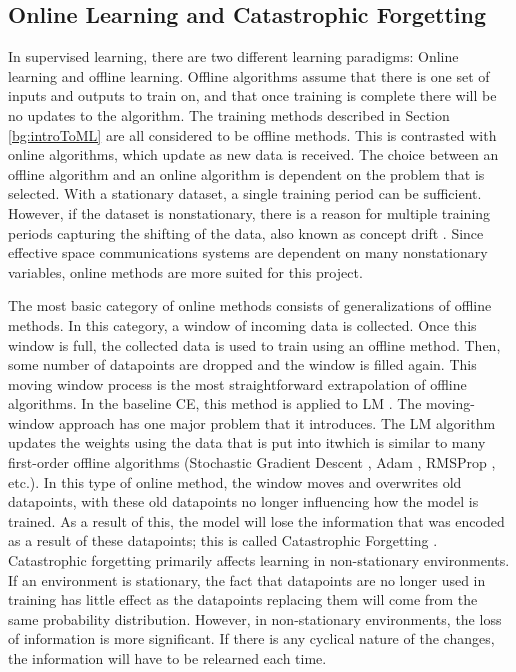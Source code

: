 	\subsection{Online Learning and Catastrophic Forgetting}\label{bg:onlineLearning}
	\par In supervised learning, there are two different learning paradigms: Online learning and offline learning. Offline algorithms assume that there is one set of inputs and outputs to train on, and that once training is complete there will be no updates to the algorithm. The training methods described in Section \ref{bg:introToML} are all considered to be offline methods. This is contrasted with online algorithms, which update as new data is received. The choice between an offline algorithm and an online algorithm is dependent on the problem that is selected. With a stationary dataset, a single training period can be sufficient. However, if the dataset is nonstationary, there is a reason for multiple training periods capturing the shifting of the data, also known as concept drift \cite{conceptDrift_semisupervised}. Since effective space communications systems are dependent on many nonstationary variables, online methods are more suited for this project.
	\par The most basic category of online methods consists of generalizations of offline methods. In this category, a window of incoming data is collected. Once this window is full, the collected data is used to train using an offline method. Then, some number of datapoints are dropped and the window is filled again. This moving window process is the most straightforward extrapolation of offline algorithms. In the baseline CE, this method is applied to LM \cite{tim_implementation_paper}. The moving-window approach has one major problem that it introduces. The LM algorithm updates the weights using the data that is put into itwhich is similar to many first-order offline algorithms (Stochastic Gradient Descent \cite{sgdPaper}, Adam \cite{AdamPaper}, RMSProp \cite{RMSPropPaper}, etc.). In this type of online method, the window moves and overwrites old datapoints, with these old datapoints no longer influencing how the model is trained. As a result of this, the model will lose the information that was encoded as a result of these datapoints; this is called Catastrophic Forgetting \cite{empericalCatForget}.  Catastrophic forgetting primarily affects learning in non-stationary environments. If an environment is stationary, the fact that datapoints are no longer used in training has little effect as the datapoints replacing them will come from the same probability distribution. However, in non-stationary environments, the loss of information is more significant. If there is any cyclical nature of the changes, the information will have to be relearned each time.
